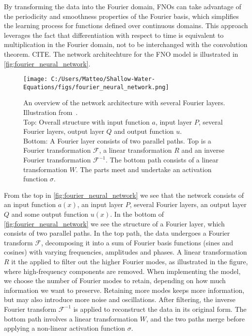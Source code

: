 By transforming the data into the Fourier domain, FNOs can take advantage of the periodicity and smoothness properties of the Fourier basis, which simplifies the learning process for functions defined over continuous domains.
This approach leverages the fact that differentiation with respect to time is equivalent to multiplication in the Fourier domain, not to be interchanged with the convolution theorem. CITE.
The network architechture for the FNO model is illustrated in \autoref{fig:fourier_neural_network}.
\begin{figure}[H]
    \centering
    \texttt{[image: C:/Users/Matteo/Shallow-Water-Equations/figs/fourier\_neural\_network.png]}
    \caption{An overview of the network architecture with several Fourier layers. Illustration from~\cite{FNO_2021}.\\
            Top: Overall structure with input function $a$, input layer $P$, several Fourier layers, output layer $Q$ and output function $u$.\\
            Bottom: A Fourier layer consists of two parallel paths. Top is a Fourier transformation $\mathcal{F}$, a linear transformation $R$ and an inverse Fourier transformation $\mathcal{F}^{-1}$.
            The bottom path consists of a linear transformation $W$. The parts meet and undertake an activation function $\sigma$.}\label{fig:fourier_neural_network}
\end{figure}
From the top in \autoref{fig:fourier_neural_network} we see that the network consists of an input function $a(x)$, an input layer $P$, several Fourier layers, an output layer $Q$ and some output function $u(x)$.
In the bottom of \autoref{fig:fourier_neural_network} we see the structure of a Fourier layer, which consists of two parallel paths.
In the top path, the data undergoes a Fourier transform $\mathcal{F}$, decomposing it into a sum of Fourier basis functions (sines and cosines) with varying frequencies, amplitudes and phases.
A linear transformation $R$ it the applied to filter out the higher Fourier modes, as illustrated in the figure, where high-frequency components are removed.
When implementing the model, we choose the number of Fourier modes to retain, depending on how much information we want to preserve.
Retaining more modes keeps more information, but may also introduce more noise and oscillations.
After filtering, the inverse Fourier transform $\mathcal{F}^{-1}$ is applied to reconstruct the data in its original form.
The bottom path involves a linear transformation $W$, and the two paths merge before applying a non-linear activation function $\sigma$.

